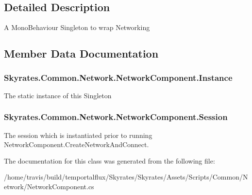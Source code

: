 \subsection{Detailed Description}
A Mono\-Behaviour Singleton to wrap Networking 



\subsection{Member Data Documentation}
\hypertarget{class_skyrates_1_1_common_1_1_network_1_1_network_component_a92cfb5ea7ee95888c7d9356e6e1add2f}{
\subsubsection[{Instance}]{ Skyrates.\-Common.\-Network.\-Network\-Component.\-Instance\hspace{0.3cm}{\ttfamily [static]}}}\label{class_skyrates_1_1_common_1_1_network_1_1_network_component_a92cfb5ea7ee95888c7d9356e6e1add2f}


The static instance of this Singleton 

\hypertarget{class_skyrates_1_1_common_1_1_network_1_1_network_component_ab7c94c6c60a85549f3b7d22d1efcab05}{
\subsubsection[{Session}]{ Skyrates.\-Common.\-Network.\-Network\-Component.\-Session}}\label{class_skyrates_1_1_common_1_1_network_1_1_network_component_ab7c94c6c60a85549f3b7d22d1efcab05}


The session which is instantiated prior to running Network\-Component.\-Create\-Network\-And\-Connect. 



The documentation for this class was generated from the following file\-:\begin{DoxyCompactItemize}
\item 
/home/travis/build/temportalflux/\-Skyrates/\-Skyrates/\-Assets/\-Scripts/\-Common/\-Network/Network\-Component.\-cs\end{DoxyCompactItemize}
